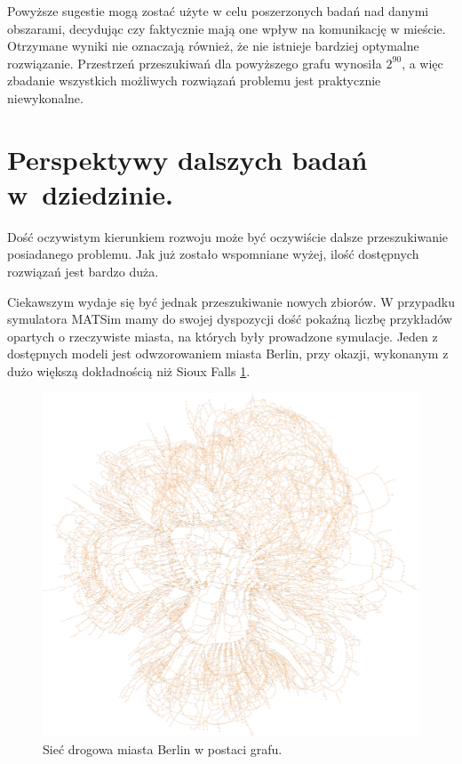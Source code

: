 \documentclass[twoside,12pt]{report}
\begin{document}
Powyższe sugestie mogą zostać użyte w celu poszerzonych badań nad danymi obszarami, decydując czy faktycznie mają one wpływ na komunikację w mieście. Otrzymane wyniki nie oznaczają również, że nie istnieje bardziej optymalne rozwiązanie. Przestrzeń przeszukiwań dla powyższego grafu wynosiła $2^{90}$, a więc zbadanie wszystkich możliwych rozwiązań problemu jest praktycznie niewykonalne.

\section{Perspektywy dalszych badań w~dziedzinie.}
Dość oczywistym kierunkiem rozwoju może być oczywiście dalsze przeszukiwanie posiadanego problemu. Jak już zostało wspomniane wyżej, ilość dostępnych rozwiązań jest bardzo duża.

Ciekawszym wydaje się być jednak przeszukiwanie nowych zbiorów. W przypadku symulatora MATSim mamy do swojej dyspozycji dość pokaźną liczbę przykładów opartych o rzeczywiste miasta, na których były prowadzone symulacje. Jeden z dostępnych modeli jest odwzorowaniem miasta Berlin, przy okazji, wykonanym z dużo większą dokładnością niż Sioux Falls \ref{berlin}.

\begin{figure}[ht]
\centering
\includegraphics[width=\textwidth]{img/berlin2}
\caption{Sieć drogowa miasta Berlin w postaci grafu.}
\label{berlin}
\end{figure}
\end{document}
